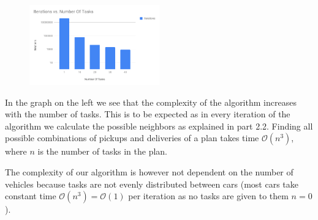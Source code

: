 \documentclass[11pt]{article}
\begin{document}
 \begin{figure}
  \includegraphics[width=0.5\textwidth]{iterations.png}
   \vspace{-20pt}
 \end{figure}
 
 
 In the graph on the left we see that the complexity of the algorithm increases
 with the number of tasks. This is to be expected as in every iteration of the
 algorithm we calculate the possible neighbors as explained in part 2.2. Finding
 all possible combinations of pickups and deliveries of a plan takes time
 $\mathcal{O}(n^3)$, where $n$ is the number of tasks in the plan. 
 
 The complexity of our algorithm is however not dependent on the number of
 vehicles because tasks are not evenly distributed between cars (most cars take
 constant time $\mathcal{O}(n^3) = \mathcal{O}(1)$ per iteration as no tasks are
 given to them $n=0$).
\end{document}
